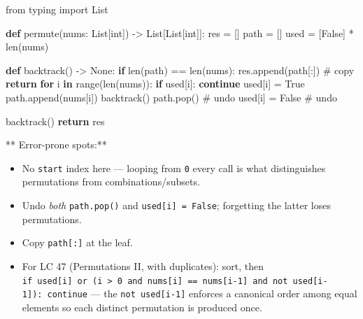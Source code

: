 \documentclass[11pt]{article}
\providecommand{\tightlist}{\setlength{\itemsep}{1pt}\setlength{\parskip}{0pt}}
\newenvironment{Shaded}{\begin{snugshade}}{\end{snugshade}}
\newcommand{\BuiltInTok}[1]{\textcolor[rgb]{0.50,0.55,0.55}{#1}}
\newcommand{\CommentTok}[1]{\textcolor[rgb]{0.48,0.49,0.49}{#1}}
\newcommand{\ControlFlowTok}[1]{\textcolor[rgb]{0.99,0.74,0.29}{\textbf{#1}}}
\newcommand{\ImportTok}[1]{\textcolor[rgb]{0.15,0.68,0.38}{#1}}
\newcommand{\KeywordTok}[1]{\textcolor[rgb]{0.81,0.81,0.76}{\textbf{#1}}}
\newcommand{\NormalTok}[1]{\textcolor[rgb]{0.81,0.81,0.76}{#1}}
\newcommand{\OperatorTok}[1]{\textcolor[rgb]{0.81,0.81,0.76}{#1}}
\newcommand{\VariableTok}[1]{\textcolor[rgb]{0.15,0.68,0.68}{#1}}
\begin{document}
\begin{Shaded}
\begin{Highlighting}[]
\ImportTok{from}\NormalTok{ typing }\ImportTok{import}\NormalTok{ List}

\KeywordTok{def}\NormalTok{ permute(nums: List[}\BuiltInTok{int}\NormalTok{]) }\OperatorTok{{-}\textgreater{}}\NormalTok{ List[List[}\BuiltInTok{int}\NormalTok{]]:}
\NormalTok{    res }\OperatorTok{=}\NormalTok{ []}
\NormalTok{    path }\OperatorTok{=}\NormalTok{ []}
\NormalTok{    used }\OperatorTok{=}\NormalTok{ [}\VariableTok{False}\NormalTok{] }\OperatorTok{*} \BuiltInTok{len}\NormalTok{(nums)}

    \KeywordTok{def}\NormalTok{ backtrack() }\OperatorTok{{-}\textgreater{}} \VariableTok{None}\NormalTok{:}
        \ControlFlowTok{if} \BuiltInTok{len}\NormalTok{(path) }\OperatorTok{==} \BuiltInTok{len}\NormalTok{(nums):}
\NormalTok{            res.append(path[:])              }\CommentTok{\# copy}
            \ControlFlowTok{return}
        \ControlFlowTok{for}\NormalTok{ i }\KeywordTok{in} \BuiltInTok{range}\NormalTok{(}\BuiltInTok{len}\NormalTok{(nums)):}
            \ControlFlowTok{if}\NormalTok{ used[i]:}
                \ControlFlowTok{continue}
\NormalTok{            used[i] }\OperatorTok{=} \VariableTok{True}
\NormalTok{            path.append(nums[i])}
\NormalTok{            backtrack()}
\NormalTok{            path.pop()                       }\CommentTok{\# undo}
\NormalTok{            used[i] }\OperatorTok{=} \VariableTok{False}                  \CommentTok{\# undo}

\NormalTok{    backtrack()}
    \ControlFlowTok{return}\NormalTok{ res}
\end{Highlighting}
\end{Shaded}

** Error-prone spots:**

\begin{itemize}
\tightlist
\item
  No \texttt{start} index here --- looping from \texttt{0} every call is what distinguishes permutations from combinations/subsets.
\item
  Undo \emph{both} \texttt{path.pop()} and \texttt{used{[}i{]}\ =\ False}; forgetting the latter loses permutations.
\item
  Copy \texttt{path{[}:{]}} at the leaf.
\item
  For LC 47 (Permutations II, with duplicates): sort, then \texttt{if\ used{[}i{]}\ or\ (i\ \textgreater{}\ 0\ and\ nums{[}i{]}\ ==\ nums{[}i-1{]}\ and\ not\ used{[}i-1{]}):\ continue} --- the \texttt{not\ used{[}i-1{]}} enforces a canonical order among equal elements so each distinct permutation is produced once.
\end{itemize}
\end{document}
